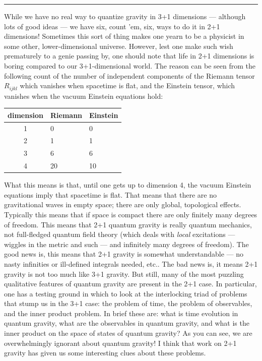 \documentclass[12pt]{article}
\def\tightlist{}
\renewcommand{\texttt}[1]{%
  \begingroup
  \ttfamily
  \begingroup\lccode`~=`/\lowercase{\endgroup\def~}{/\discretionary{}{}{}}%
  \begingroup\lccode`~=`[\lowercase{\endgroup\def~}{[\discretionary{}{}{}}%
  \begingroup\lccode`~=`.\lowercase{\endgroup\def~}{.\discretionary{}{}{}}%
  \catcode`/=\active\catcode`[=\active\catcode`.=\active
  \scantokens{#1\noexpand}%
  \endgroup
}
\begin{document}
\begin{center}\rule{0.5\linewidth}{0.5pt}\end{center}


While we have no real way to quantize gravity in 3+1 dimensions ---
although lots of good ideas --- we have six, count 'em, six, ways to do
it in 2+1 dimensions! Sometimes this sort of thing makes one yearn to be
a physicist in some other, lower-dimensional universe. However, lest one
make such wish prematurely to a genie passing by, one should note that
life in 2+1 dimensions is boring compared to our 3+1-dimensional world.
The reason can be seen from the following count of the number of
independent components of the Riemann tensor \(R_{ijkl}\) which vanishes
when spacetime is flat, and the Einstein tensor, which vanishes when the
vacuum Einstein equations hold:

\begin{longtable}[]{@{}cll@{}}
\toprule
dimension & Riemann & Einstein\tabularnewline
\midrule
\endhead
1 & 0 & 0\tabularnewline
2 & 1 & 1\tabularnewline
3 & 6 & 6\tabularnewline
4 & 20 & 10\tabularnewline
\bottomrule
\end{longtable}

What this means is that, until one gets up to dimension 4, the vacuum
Einstein equations imply that spacetime is flat. That means that there
are no gravitational waves in empty space; there are only global,
topological effects. Typically this means that if space is compact there
are only finitely many degrees of freedom. This means that 2+1 quantum
gravity is really quantum mechanics, not full-fledged quantum field
theory (which deals with \emph{local} excitations --- wiggles in the
metric and such --- and infinitely many degrees of freedom). The good
news is, this means that 2+1 gravity is somewhat understandable --- no
nasty infinities or ill-defined integrals needed, etc.. The bad news is,
it means 2+1 gravity is not too much like 3+1 gravity. But still, many
of the most puzzling qualitative features of quantum gravity are present
in the 2+1 case. In particular, one has a testing ground in which to
look at the interlocking triad of problems that stump us in the 3+1
case: the problem of time, the problem of observables, and the inner
product problem. In brief these are: what is time evolution in quantum
gravity, what are the observables in quantum gravity, and what is the
inner product on the space of states of quantum gravity? As you can see,
we are overwhelmingly ignorant about quantum gravity! I think that work
on 2+1 gravity has given us some interesting clues about these problems.
\end{document}
